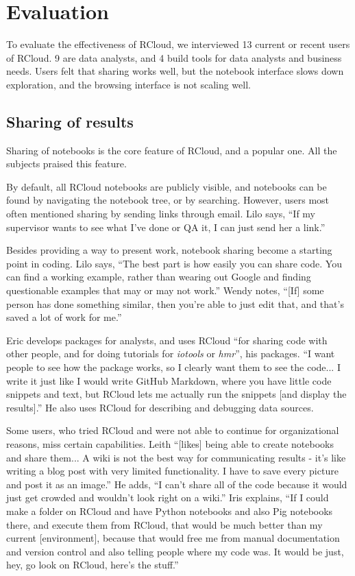 \section{Evaluation\label{sec:interviews}}

To evaluate the effectiveness of RCloud, we interviewed 13 current or
recent users of RCloud. 9 are data analysts, and 4 build tools for data
analysts and business needs. Users felt that sharing works well, but the notebook
interface slows down exploration, and the browsing interface is not scaling well.

\subsection{Sharing of results}
Sharing of notebooks is the core feature of RCloud, and a popular one. All
the subjects praised this feature.

By default, all RCloud notebooks are publicly visible, and notebooks can be
found by navigating the notebook tree, or by searching. However, users most
often mentioned sharing by sending links through email. Lilo says,
``If my supervisor wants to see what I've done or QA it, I can just send her a link.''

Besides providing a way to present work, notebook sharing become a starting point
in coding. Lilo says, ``The best part is how easily you can
share code. You can find a working example, rather than wearing
out Google and finding questionable examples that may or may not work.'' Wendy
notes, ``[If] some person has done something similar, then you're able to just
edit that, and that's saved a lot of work for me.''

Eric develops packages for analysts, and uses RCloud ``for sharing code with
other people, and for doing tutorials for {\em iotools} or {\em hmr}'', his packages.
``I want people to see how the package works, so I clearly want them
to see the code... I write it just like I would write GitHub
Markdown, where you have little code snippets and text, but RCloud lets me
actually run the snippets [and display the results].'' He also uses RCloud for
describing and debugging data sources.

Some users, who tried RCloud and were not able to continue for organizational
reasons, miss certain capabilities. Leith ``[likes]  being
able to create notebooks and share them... A wiki is not the best way for
communicating results - it's  like writing a blog post with very limited
functionality. I have to save every picture and post it as an image.'' He adds,
``I can't share all of the code because it would just get crowded and wouldn't
look right on a wiki.'' Iris explains, ``If I could make a folder on RCloud and
have Python notebooks and also Pig notebooks there, and execute them from RCloud,
that would be much better than my current [environment], because that would free
me from manual documentation and version control and also telling people where
my code was. It would be just, hey, go look on RCloud, here's the stuff.''

